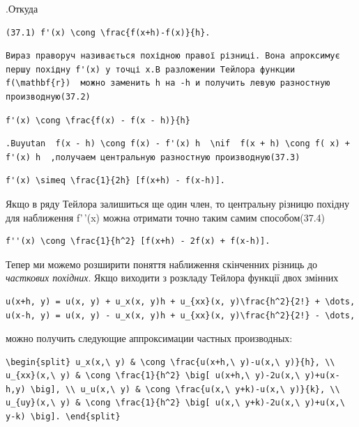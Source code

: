 \documentclass[
  ukrainian,
]{article}
\begin{document}
.Откуда

\begin{verbatim}
(37.1) f'(x) \cong \frac{f(x+h)-f(x)}{h}.
\end{verbatim}

\begin{verbatim}
Вираз праворуч називається похідною правої різниці. Вона апроксимує першу похідну f'(x) у точці x.В разложении Тейлора функции  f(\mathbf{r})  можно заменить h на -h и получить левую разностную производную(37.2)
\end{verbatim}

\begin{verbatim}
f'(x) \cong \frac{f(x) - f(x - h)}{h}
\end{verbatim}

\begin{verbatim}
.Buyutan  f(x - h) \cong f(x) - f'(x) h  \nif  f(x + h) \cong f( x) + f'(x) h  ,получаем центральную разностную производную(37.3)
\end{verbatim}

\begin{verbatim}
f'(x) \simeq \frac{1}{2h} [f(x+h) - f(x-h)].
\end{verbatim}

Якщо в ряду Тейлора залишиться ще один член, то центральну різницю
похідну для наближення f'\,'(x) можна отримати точно таким самим
способом(37.4)

\begin{verbatim}
f''(x) \cong \frac{1}{h^2} [f(x+h) - 2f(x) + f(x-h)].
\end{verbatim}

Тепер ми можемо розширити поняття наближення скінченних різниць до
\emph{часткових похідних}. Якщо виходити з розкладу Тейлора функції двох
змінних

\begin{verbatim}
u(x+h, y) = u(x, y) + u_x(x, y)h + u_{xx}(x, y)\frac{h^2}{2!} + \dots,
u(x-h, y) = u(x, y) - u_x(x, y)h + u_{xx}(x, y)\frac{h^2}{2!} - \dots,
\end{verbatim}

можно получить следующие аппроксимации частных производных:

\begin{verbatim}
\begin{split} u_x(x,\ y) & \cong \frac{u(x+h,\ y)-u(x,\ y)}{h}, \\ u_{xx}(x,\ y) & \cong \frac{1}{h^2} \big[ u(x+h,\ y)-2u(x,\ y)+u(x-h,y) \big], \\ u_u(x,\ y) & \cong \frac{u(x,\ y+k)-u(x,\ y)}{k}, \\ u_{uy}(x,\ y) & \cong \frac{1}{h^2} \big[ u(x,\ y+k)-2u(x,\ y)+u(x,\ y-k) \big]. \end{split}
\end{verbatim}
\end{document}
